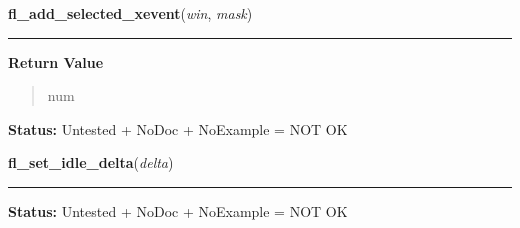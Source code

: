     \vspace{0.5ex}

\hspace{.8\funcindent}\begin{boxedminipage}{\funcwidth}

    \raggedright \textbf{fl\_add\_selected\_xevent}(\textit{win}, \textit{mask})

    \vspace{-1.5ex}

    \rule{\textwidth}{0.5\fboxrule}
\setlength{\parskip}{2ex}
\setlength{\parskip}{1ex}
      \textbf{Return Value}
    \vspace{-1ex}

      \begin{quote}
      num

      \end{quote}

\textbf{Status:} Untested + NoDoc + NoExample = NOT OK



    \end{boxedminipage}

    \label{xformslib:library:fl_set_idle_delta}

    \vspace{0.5ex}

\hspace{.8\funcindent}\begin{boxedminipage}{\funcwidth}

    \raggedright \textbf{fl\_set\_idle\_delta}(\textit{delta})

    \vspace{-1.5ex}

    \rule{\textwidth}{0.5\fboxrule}
\setlength{\parskip}{2ex}
\setlength{\parskip}{1ex}
\textbf{Status:} Untested + NoDoc + NoExample = NOT OK



    \end{boxedminipage}

    \label{xformslib:library:fl_add_event_callback}

    \vspace{0.5ex}

